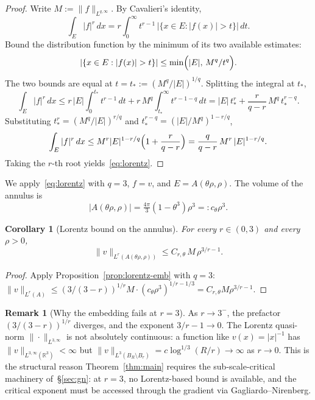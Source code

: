 \documentclass[11pt]{amsart}
\newtheorem{corollary}[theorem]{Corollary}
\theoremstyle{definition}
\newtheorem{remark}[theorem]{Remark}
\newcommand{\RR}{\mathbb{R}}
\newcommand{\norm}[1]{\|#1\|}
\newcommand{\abs}[1]{|#1|}
\begin{document}
\begin{proof}
Write $M := \norm{f}_{L^{q,\infty}}$. By Cavalieri's identity,
\[
\int_E \abs{f}^r\, dx = r \int_0^\infty t^{r-1}\,
\abs{\{x \in E : \abs{f(x)} > t\}}\, dt.
\]
Bound the distribution function by the minimum of its two
available estimates:
\[
\abs{\{x \in E : \abs{f(x)} > t\}} \leq \min\Bigl(\abs{E},\, M^q / t^q\Bigr).
\]
The two bounds are equal at $t = t_* := (M^q / \abs{E})^{1/q}$.
Splitting the integral at $t_*$,
\[
\int_E \abs{f}^r\, dx \leq r\,\abs{E}\int_0^{t_*} t^{r-1}\,dt
+ r\,M^q \int_{t_*}^\infty t^{r-1-q}\, dt
= \abs{E}\, t_*^r + \frac{r}{q-r}\, M^q\, t_*^{r - q}.
\]
Substituting $t_*^r = (M^q/\abs{E})^{r/q}$ and $t_*^{r - q} =
(\abs{E}/M^q)^{1 - r/q}$,
\[
\int_E \abs{f}^r\, dx \leq M^r \abs{E}^{1 - r/q}
\Bigl(1 + \frac{r}{q - r}\Bigr)
= \frac{q}{q - r}\, M^r\, \abs{E}^{1 - r/q}.
\]
Taking the $r$-th root yields~\eqref{eq:lorentz}.
\end{proof}

We apply~\eqref{eq:lorentz} with $q = 3$, $f = v$, and $E =
A(\theta\rho, \rho)$. The volume of the annulus is
\[
\abs{A(\theta\rho, \rho)} = \tfrac{4\pi}{3}(1 - \theta^3)\rho^3
=: c_\theta \rho^3.
\]

\begin{corollary}[Lorentz bound on the annulus]
\label{cor:lorentz-v}
For every $r \in (0, 3)$ and every $\rho > 0$,
\begin{equation}\label{eq:v-lorentz}
\norm{v}_{L^r(A(\theta\rho, \rho))}
\leq C_{r, \theta}\, M\, \rho^{3/r - 1}.
\end{equation}
\end{corollary}

\begin{proof}
Apply Proposition~\ref{prop:lorentz-emb} with $q = 3$:
$\norm{v}_{L^r(A)} \leq (3/(3-r))^{1/r} M \cdot (c_\theta
\rho^3)^{1/r - 1/3} = C_{r,\theta} M \rho^{3/r - 1}$.
\end{proof}

\begin{remark}[Why the embedding fails at $r = 3$]
\label{rem:lorentz-endpoint}
As $r \to 3^-$, the prefactor $(3/(3-r))^{1/r}$ diverges, and
the exponent $3/r - 1 \to 0$. The Lorentz quasi-norm
$\norm{\cdot}_{L^{3,\infty}}$ is not absolutely continuous:
a function like $v(x) = \abs{x}^{-1}$ has
$\norm{v}_{L^{3,\infty}(\RR^3)} < \infty$ but
$\norm{v}_{L^3(B_R \setminus B_r)} = c\log^{1/3}(R/r) \to \infty$
as $r \to 0$. This is the structural reason Theorem~\ref{thm:main}
requires the sub-scale-critical machinery of~\S\ref{sec:gn}: at
$r = 3$, no Lorentz-based bound is available, and the critical
exponent must be accessed through the gradient via
Gagliardo--Nirenberg.
\end{remark}
\end{document}
